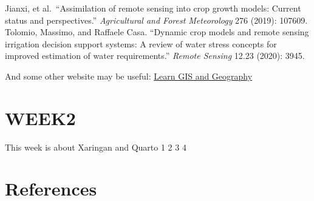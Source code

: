 \documentclass[
  letterpaper,
  DIV=11,
  numbers=noendperiod]{scrreprt}
\newlength{\cslhangindent}
\newlength{\cslentryspacingunit} %
\newenvironment{CSLReferences}[2] %
 {%
  \setlength{\parindent}{0pt}
  \ifodd #1
  \let\oldpar\par
  \def\par{\hangindent=\cslhangindent\oldpar}
  \fi
  \setlength{\parskip}{#2\cslentryspacingunit}
 }%
 {}
\begin{document}
Jianxi, et al.~``Assimilation of remote sensing into crop growth models:
Current status and perspectives.'' \emph{Agricultural and Forest
Meteorology} 276 (2019): 107609.\\
\hspace*{0.333em}\hspace*{0.333em}\hspace*{0.333em}\hspace*{0.333em}\hspace*{0.333em}\hspace*{0.333em}\hspace*{0.333em}\hspace*{0.333em}Tolomio,
Massimo, and Raffaele Casa. ``Dynamic crop models and remote sensing
irrigation decision support systems: A review of water stress concepts
for improved estimation of water requirements.'' \emph{Remote Sensing}
12.23 (2020): 3945.

And some other website may be useful:
\href{https://gisgeography.com/}{Learn GIS and Geography}


\hypertarget{week2}{%
\chapter{WEEK2}\label{week2}}

This week is about Xaringan and Quarto 1 2 3 4


\hypertarget{references}{%
\chapter*{References}\label{references}}

\hypertarget{refs}{}
\begin{CSLReferences}{0}{0}
\end{CSLReferences}
\end{document}
